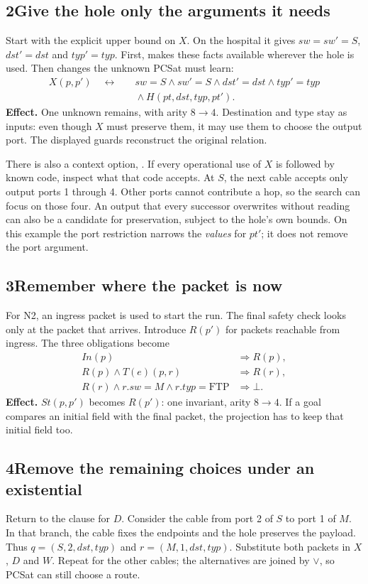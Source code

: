 \documentclass[11pt,a4paper]{article}
\newcommand{\pass}[2]{\subsection*{#1\quad #2}}
\newcommand{\code}[1]{\texttt{\detokenize{#1}}}
\begin{document}
\newpage
\pass{2}{Give the hole only the arguments it needs}
Start with the explicit upper bound on $X$. On the hospital it gives
$sw=sw'=S$, $dst'=dst$ and $typ'=typ$. First, \code{hole_frame} makes these
facts available wherever the hole is used. Then \code{hole_arity} changes
the unknown PCSat must learn:
\[
\begin{aligned}
X(p,p')\quad\longleftrightarrow\quad
 &sw=S\land sw'=S\land dst'=dst\land typ'=typ\\
 &{}\land H(pt,dst,typ,pt').
\end{aligned}
\]
\textbf{Effect.} One unknown remains, with arity $8\to4$. Destination and type
stay as inputs: even though $X$ must preserve them, it may use them to choose
the output port. The displayed guards reconstruct the original relation.

There is also a context option, \code{hole_context}. If every operational use
of $X$ is followed by known code, inspect what that code accepts. At $S$, the
next cable accepts only output ports 1 through 4. Other ports cannot contribute
a hop, so the search can focus on those four. An output that every successor
overwrites without reading can also be a candidate for preservation, subject
to the hole's own bounds. On this example the port restriction narrows the
\emph{values} for $pt'$; it does not remove the port argument.

\pass{3}{Remember where the packet is now}
For N2, an ingress packet is used to start the run. The final safety check
looks only at the packet that arrives. Introduce $R(p')$ for packets reachable
from ingress. The three obligations become
\[
\begin{aligned}
\mathit{In}(p)&\Rightarrow R(p),\\
R(p)\land T(e)(p,r)&\Rightarrow R(r),\\
R(r)\land r.sw=M\land r.typ=\mathrm{FTP}&\Rightarrow\bot .
\end{aligned}
\]
\textbf{Effect.} $St(p,p')$ becomes $R(p')$: one invariant, arity $8\to4$.
If a goal compares an initial field with the final packet, the projection has
to keep that initial field too.

\pass{4}{Remove the remaining choices under an existential}
Return to the clause for $D$. Consider the cable from port 2 of $S$ to port 1
of $M$. In that branch, the cable fixes the endpoints and the hole preserves
the payload. Thus $q=(S,2,dst,typ)$ and $r=(M,1,dst,typ)$. Substitute both
packets in $X$, $D$ and $W$. Repeat for the other cables; the alternatives
are joined by $\lor$, so PCSat can still choose a route.
\end{document}
